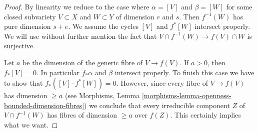 \begin{proof}

By linearity we reduce to the case where $\alpha = [V]$ and
$\beta = [W]$ for some closed subvariety $V \subset X$ and
$W \subset Y$ of dimension $r$ and $s$. Then $f^{-1}(W)$ has
pure dimension $s + e$. We assume the cycles
$[V]$ and $f^*[W]$ intersect properly. We will use without
further mention the fact that $V \cap f^{-1}(W) \to f(V) \cap W$
is surjective.

\medskip\noindent
Let $a$ be the dimension of the generic fibre of $V \to f(V)$.
If $a > 0$, then $f_*[V] = 0$. In particular $f_*\alpha$ and $\beta$
intersect properly. To finish this case we have to show that
$f_*([V] \cdot f^*[W]) = 0$. However, since every fibre of
$V \to f(V)$ has dimension $\geq a$ (see
Morphisms, Lemma \ref{morphisms-lemma-openness-bounded-dimension-fibres})
we conclude that every irreducible component $Z$ of $V \cap f^{-1}(W)$
has fibres of dimension $\geq a$ over $f(Z)$. This certainly
implies what we want.


\end{proof}
